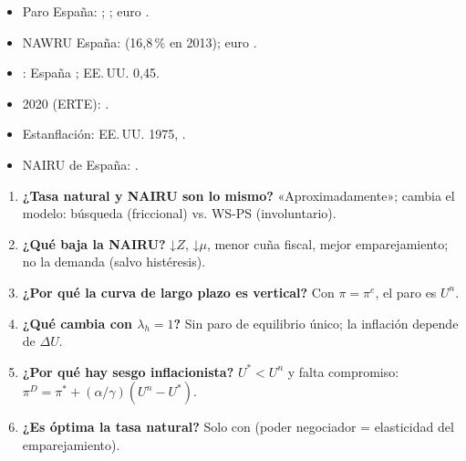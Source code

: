 \documentclass{article}
\begin{document}
\begin{columnas}
\anexorepaso
{}
\begin{itemize}
\item Paro España: ; ; euro .
\item NAWRU España:  (16,8\,\% en 2013); euro .
\item {}: España ; EE.\,UU. 0,45.
\item 2020 (ERTE): .
\item Estanflación: EE.\,UU. 1975, .
\item NAIRU de España: .
\end{itemize}
\begin{enumerate}
\item \textbf{¿Tasa natural y NAIRU son lo mismo?} «Aproximadamente»; cambia el modelo: búsqueda (friccional) vs. WS-PS (involuntario).
\item \textbf{¿Qué baja la NAIRU?} ↓$Z$, ↓$\mu$, menor cuña fiscal, mejor emparejamiento; no la demanda (salvo histéresis).
\item \textbf{¿Por qué la curva de largo plazo es vertical?} Con $\pi=\pi^e$, el paro es $U^n$.
\item \textbf{¿Qué cambia con $\lambda_h=1$?} Sin paro de equilibrio único; la inflación depende de $\Delta U$.
\item \textbf{¿Por qué hay sesgo inflacionista?} $U^*<U^n$ y falta compromiso: $\pi^D=\pi^*+(\alpha/\gamma)(U^n-U^*)$.
\item \textbf{¿Es óptima la tasa natural?} Solo con  (poder negociador = elasticidad del emparejamiento).
\end{enumerate}

\end{columnas}
\end{document}

